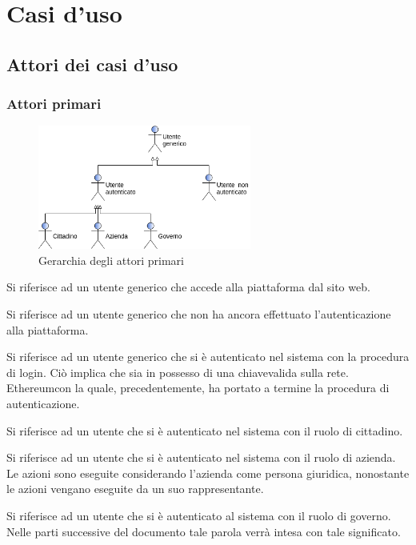 \section{Casi d'uso} 
\subsection{Attori dei casi d'uso}
\subsubsection{Attori primari}
\begin{figure}[h]
	\includegraphics[width=7cm]{res/images/attori_primari.png}
	\centering
	\caption{Gerarchia degli attori primari}
\end{figure}
\begin{description}[style=nextline]
	\item[Utente generico]
	Si riferisce ad un utente generico che accede alla piattaforma dal sito web.
	\item[Utente non autenticato]
	Si riferisce ad un utente generico che non ha ancora effettuato l'autenticazione alla piattaforma.
	\item[Utente autenticato]
	Si riferisce ad un utente generico che si è autenticato nel sistema con la procedura di login. Ciò implica che sia in possesso di una chiave\glosp valida sulla rete. Ethereum\glosp con la quale, precedentemente, ha portato a termine la procedura di autenticazione.
	\item[Cittadino] Si riferisce ad un utente che si è autenticato nel sistema con il ruolo di cittadino.
	\item[Azienda] Si riferisce ad un utente che si è autenticato nel sistema con il ruolo di azienda. Le azioni sono eseguite considerando l'azienda come persona giuridica, nonostante le azioni vengano eseguite da un suo rappresentante.
	\item[Governo\glosp] Si riferisce ad un utente che si è autenticato al sistema con il ruolo di governo\glo. Nelle parti successive del documento tale parola verrà intesa con tale significato.
\end{description}

